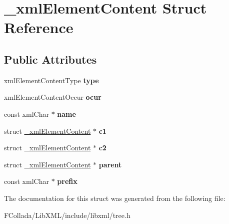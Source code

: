 \hypertarget{struct__xmlElementContent}{
\section{\_\-xmlElementContent Struct Reference}
\label{struct__xmlElementContent}
}
\subsection*{Public Attributes}
\begin{DoxyCompactItemize}
\item 
\hypertarget{struct__xmlElementContent_a9ec31227deddf6cb534eaba958cc8a2a}{
xmlElementContentType {\bfseries type}}
\label{struct__xmlElementContent_a9ec31227deddf6cb534eaba958cc8a2a}

\item 
\hypertarget{struct__xmlElementContent_a45c3092e58963270a4c9640016b61ce3}{
xmlElementContentOccur {\bfseries ocur}}
\label{struct__xmlElementContent_a45c3092e58963270a4c9640016b61ce3}

\item 
\hypertarget{struct__xmlElementContent_ad383369c8a49f1cb3999439c62c9f98f}{
const xmlChar $\ast$ {\bfseries name}}
\label{struct__xmlElementContent_ad383369c8a49f1cb3999439c62c9f98f}

\item 
\hypertarget{struct__xmlElementContent_af125e186de93fc51a627314d7d19fd83}{
struct \hyperlink{struct__xmlElementContent}{\_\-xmlElementContent} $\ast$ {\bfseries c1}}
\label{struct__xmlElementContent_af125e186de93fc51a627314d7d19fd83}

\item 
\hypertarget{struct__xmlElementContent_a198db6da2997f0b080b90cd5e810abc7}{
struct \hyperlink{struct__xmlElementContent}{\_\-xmlElementContent} $\ast$ {\bfseries c2}}
\label{struct__xmlElementContent_a198db6da2997f0b080b90cd5e810abc7}

\item 
\hypertarget{struct__xmlElementContent_af3f9d19c234e96d250039a2c614fe135}{
struct \hyperlink{struct__xmlElementContent}{\_\-xmlElementContent} $\ast$ {\bfseries parent}}
\label{struct__xmlElementContent_af3f9d19c234e96d250039a2c614fe135}

\item 
\hypertarget{struct__xmlElementContent_acd325785e618ba78d92a889e134bc287}{
const xmlChar $\ast$ {\bfseries prefix}}
\label{struct__xmlElementContent_acd325785e618ba78d92a889e134bc287}

\end{DoxyCompactItemize}


The documentation for this struct was generated from the following file:\begin{DoxyCompactItemize}
\item 
FCollada/LibXML/include/libxml/tree.h\end{DoxyCompactItemize}
